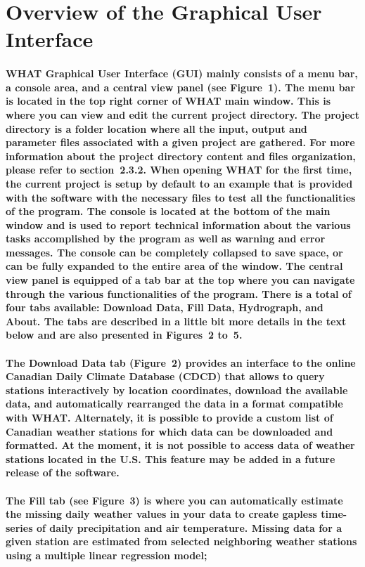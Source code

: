 \documentclass[10pt, letterpaper, fleqn]{report}
\begin{document}
\section{Overview of the Graphical User Interface}

\paragraph{WHAT Graphical User Interface (GUI) mainly consists of a menu bar, a console area, and a central view panel (see Figure 1). The menu bar is located in the top right corner of WHAT main window. This is where you can view and edit the current project directory. The project directory is a folder location where all the input, output and parameter files associated with a given project are gathered. For more information about the project directory content and files organization, please refer to section 2.3.2. When opening WHAT for the first time, the current project is setup by default to an example that is provided with the software with the necessary files to test all the functionalities of the program. The console is located at the bottom of the main window and is used to report technical information about the various tasks accomplished by the program as well as warning and error messages. The console can be completely collapsed to save space, or can be fully expanded to the entire area of the window. The central view panel is equipped of a tab bar at the top where you can navigate through the various functionalities of the program. There is a total of four tabs available: Download Data, Fill Data, Hydrograph, and About. The tabs are described in a little bit more details in the text below and are also presented in Figures 2 to 5.}

\paragraph{The Download Data tab (Figure 2) provides an interface to the online Canadian Daily Climate Database (CDCD) that allows to query stations interactively by location coordinates, download the available data, and automatically rearranged the data in a format compatible with WHAT. Alternately, it is possible to provide a custom list of Canadian weather stations for which data can be downloaded and formatted. At the moment, it is not possible to access data of weather stations located in the U.S. This feature may be added in a future release of the software.}

\paragraph{The Fill tab (see Figure 3) is where you can automatically estimate the missing daily weather values in your data to create gapless time-series of daily precipitation and air temperature. Missing data for a given station are estimated from selected neighboring weather stations using a multiple linear regression model;}
\end{document}

